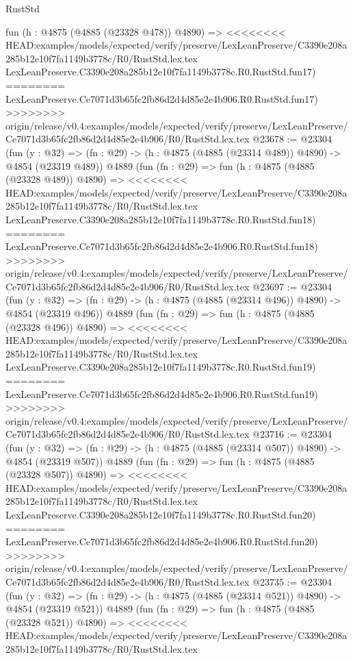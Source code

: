 \begin{lexlean}{RustStd}
\begin{coremodule}
{\begin{coremodule}
{{{{{{{{{{{{{{{{{{{{{{{{{{{{{    fun (h : @4875 (@4885 (@23328 @478)) @4890) =>
<<<<<<<< HEAD:examples/models/expected/verify/preserve/LexLeanPreserve/C3390e208a285b12e10f7fa1149b3778c/R0/RustStd.lex.tex
    LexLeanPreserve.C3390e208a285b12e10f7fa1149b3778c.R0.RustStd.fun17)
========
    LexLeanPreserve.Ce7071d3b65fc2fb86d2d4d85e2e4b906.R0.RustStd.fun17)
>>>>>>>> origin/release/v0.4:examples/models/expected/verify/preserve/LexLeanPreserve/Ce7071d3b65fc2fb86d2d4d85e2e4b906/R0/RustStd.lex.tex
@23678 := @23304
    (fun (y : @32) => (fn : @29) -> (h : @4875 (@4885 (@23314 @489)) @4890) -> @4854 (@23319 @489))
    @4889
    (fun (fn : @29) =>
    fun (h : @4875 (@4885 (@23328 @489)) @4890) =>
<<<<<<<< HEAD:examples/models/expected/verify/preserve/LexLeanPreserve/C3390e208a285b12e10f7fa1149b3778c/R0/RustStd.lex.tex
    LexLeanPreserve.C3390e208a285b12e10f7fa1149b3778c.R0.RustStd.fun18)
========
    LexLeanPreserve.Ce7071d3b65fc2fb86d2d4d85e2e4b906.R0.RustStd.fun18)
>>>>>>>> origin/release/v0.4:examples/models/expected/verify/preserve/LexLeanPreserve/Ce7071d3b65fc2fb86d2d4d85e2e4b906/R0/RustStd.lex.tex
@23697 := @23304
    (fun (y : @32) => (fn : @29) -> (h : @4875 (@4885 (@23314 @496)) @4890) -> @4854 (@23319 @496))
    @4889
    (fun (fn : @29) =>
    fun (h : @4875 (@4885 (@23328 @496)) @4890) =>
<<<<<<<< HEAD:examples/models/expected/verify/preserve/LexLeanPreserve/C3390e208a285b12e10f7fa1149b3778c/R0/RustStd.lex.tex
    LexLeanPreserve.C3390e208a285b12e10f7fa1149b3778c.R0.RustStd.fun19)
========
    LexLeanPreserve.Ce7071d3b65fc2fb86d2d4d85e2e4b906.R0.RustStd.fun19)
>>>>>>>> origin/release/v0.4:examples/models/expected/verify/preserve/LexLeanPreserve/Ce7071d3b65fc2fb86d2d4d85e2e4b906/R0/RustStd.lex.tex
@23716 := @23304
    (fun (y : @32) => (fn : @29) -> (h : @4875 (@4885 (@23314 @507)) @4890) -> @4854 (@23319 @507))
    @4889
    (fun (fn : @29) =>
    fun (h : @4875 (@4885 (@23328 @507)) @4890) =>
<<<<<<<< HEAD:examples/models/expected/verify/preserve/LexLeanPreserve/C3390e208a285b12e10f7fa1149b3778c/R0/RustStd.lex.tex
    LexLeanPreserve.C3390e208a285b12e10f7fa1149b3778c.R0.RustStd.fun20)
========
    LexLeanPreserve.Ce7071d3b65fc2fb86d2d4d85e2e4b906.R0.RustStd.fun20)
>>>>>>>> origin/release/v0.4:examples/models/expected/verify/preserve/LexLeanPreserve/Ce7071d3b65fc2fb86d2d4d85e2e4b906/R0/RustStd.lex.tex
@23735 := @23304
    (fun (y : @32) => (fn : @29) -> (h : @4875 (@4885 (@23314 @521)) @4890) -> @4854 (@23319 @521))
    @4889
    (fun (fn : @29) =>
    fun (h : @4875 (@4885 (@23328 @521)) @4890) =>
<<<<<<<< HEAD:examples/models/expected/verify/preserve/LexLeanPreserve/C3390e208a285b12e10f7fa1149b3778c/R0/RustStd.lex.tex
}}}}}}}}}}}}}}}}}}}}}}}}}}}}}
\end{coremodule}}
\end{coremodule}
\end{lexlean}
